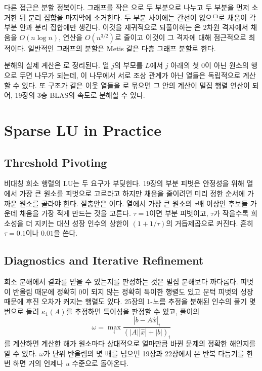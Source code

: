 다른 접근은 분할 정복이다. 그래프를 작은 으로 두 부분으로 나누고 두 부분을 먼저 소거한 뒤 분리 집합을 마지막에 소거한다. 두 부분 사이에는 간선이 없으므로 채움이 각 부분 안과 분리 집합에만 생긴다. 이것을 재귀적으로 되풀이하는 은 2차원 격자에서 채움을 $O(n\log n)$, 연산을 $O(n^{3/2})$로 줄이고 이것이 그 격자에 대해 점근적으로 최적이다\cite{george1973nested}. 일반적인 그래프의 분할은 Metis 같은 다층 그래프 분할로 한다\cite{karypis1998metis}.

분해의 실제 계산은 로 정리된다\cite{liu1990etree}. 열 $j$의 부모를 $L$에서 $j$ 아래의 첫 $0$이 아닌 원소의 행으로 두면 나무가 되는데, 이 나무에서 서로 조상 관계가 아닌 열들은 독립적으로 계산할 수 있다. 또 구조가 같은 이웃 열들을 로 묶으면 그 안의 계산이 밀집 행렬 연산이 되어, 19장의 3층 BLAS의 속도로 분해할 수 있다\cite{davis2006direct}.

\section{Sparse LU in Practice}
\label{sec:sparse-lu}

\subsection{Threshold Pivoting}

비대칭 희소 행렬의 LU는 두 요구가 부딪힌다. 19장의 부분 피벗은 안정성을 위해 열에서 가장 큰 원소를 피벗으로 고르라고 하지만 채움을 줄이려면 미리 정한 순서에 가까운 원소를 골라야 한다. 절충안은 이다. 열에서 가장 큰 원소의 $\tau$배 이상인 후보들 가운데 채움을 가장 적게 만드는 것을 고른다. $\tau=1$이면 부분 피벗이고, $\tau$가 작을수록 희소성을 더 지키는 대신 성장 인수의 상한이 $(1+1/\tau)$의 거듭제곱으로 커진다. 흔히 $\tau=0.1$이나 $0.01$을 쓴다.

\subsection{Diagnostics and Iterative Refinement}

희소 분해에서 결과를 믿을 수 있는지를 판정하는 것은 밀집 분해보다 까다롭다. 피벗이 반올림 때문에 정확히 $0$이 되지 않는 정확히 특이한 행렬도 있고 문턱 피벗의 성장 때문에 후진 오차가 커지는 행렬도 있다. 25장의 1-노름 추정을 분해된 인수의 풀기 몇 번으로 돌려 $\kappa_1(A)$를 추정하면 특이성을 판정할 수 있고, 풀이의 
\[
\omega=\max_i\frac{|b-A\hat x|_i}{(|A||\hat x|+|b|)_i}
\]
를 계산하면 계산한 해가 원소마다 상대적으로 얼마만큼 바뀐 문제의 정확한 해인지를 알 수 있다\cite{oettli1964}. $\omega$가 단위 반올림의 몇 배를 넘으면 19장과 22장에서 본 반복 다듬기를 한 번 하면 거의 언제나 $u$ 수준으로 돌아온다.

